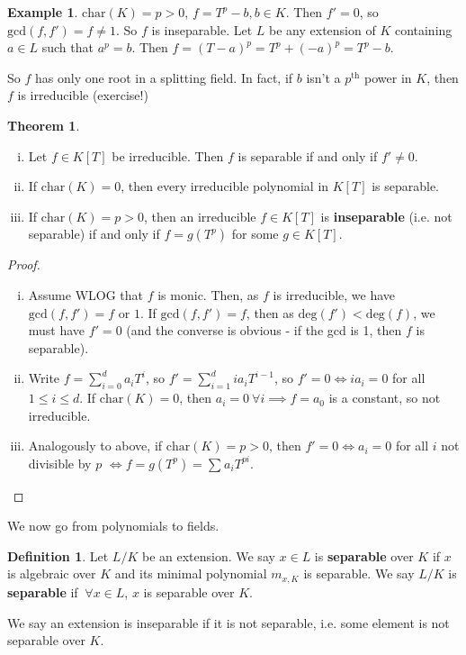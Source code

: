 \documentclass{article}
\theoremstyle{definition}
\newtheorem{theorem}{Theorem}[section]
\newtheorem{example}{Example}[section]
\newtheorem{defn}{Definition}[section]
\begin{document}
\begin{example}
    $\text{char}(K)=p>0$, $f = T^p - b, b \in K$. Then $f'=0$, so $\text{gcd}(f,f')=f \neq 1$. So $f$ is inseparable. Let $L$ be any extension of $K$ containing $a \in L$ such that $a^p = b$. Then $f=(T-a)^p = T^p + (-a)^p = T^p - b$.

    So $f$ has only one root in a splitting field. In fact, if $b$ isn't a $p^{\text{th}}$ power in $K$, then $f$ is irreducible (exercise!)
\end{example}
\begin{theorem}
    \begin{enumerate}[(i)]
        \item Let $f \in K[T]$ be irreducible. Then $f$ is separable if and only if $f' \neq 0$.
        \item If $\text{char}(K)=0$, then every irreducible polynomial in $K[T]$ is separable.
        \item If $\text{char}(K)=p>0$, then an irreducible $f \in K[T]$ is \textbf{inseparable} (i.e. not separable) if and only if $f=g(T^p)$ for some $g \in K[T]$.
    \end{enumerate}
\end{theorem}
\begin{proof}
    \begin{enumerate}[(i)]
        \item Assume WLOG that $f$ is monic. Then, as $f$ is irreducible, we have $\text{gcd}(f,f') = f$ or $1$. If $\text{gcd}(f,f')=f$, then as $\text{deg}(f')<\text{deg}(f)$, we must have $f'=0$ (and the converse is obvious - if the gcd is 1, then $f$ is separable).
        \item Write $f = \sum_{i=0}^{d} a_iT^i$, so $f' = \sum_{i=1}^{d} ia_iT^{i-1}$, so $f'=0 \iff ia_i = 0$ for all $1\le i\le d$. If $\text{char}(K)=0$, then $a_i=0 ~\forall i \implies f = a_0$ is a constant, so not irreducible.
        \item Analogously to above, if $\text{char}(K)=p>0$, then $f'=0 \iff a_i=0$ for all $i$ not divisible by $p$ $\iff f=g(T^p) = \sum_{}^{} a_{i}T^{pi}$.
    \end{enumerate}
\end{proof}
We now go from polynomials to fields.
\begin{defn}
    Let $L/K$ be an extension. We say $x \in L$ is \textbf{separable} over $K$ if $x$ is algebraic over $K$ and its minimal polynomial $m_{x,K}$ is separable. We say $L/K$ is \textbf{separable} if $~\forall x \in L$, $x$ is separable over $K$.

    We say an extension is inseparable if it is not separable, i.e. some element is not separable over $K$.
\end{defn}
\end{document}
